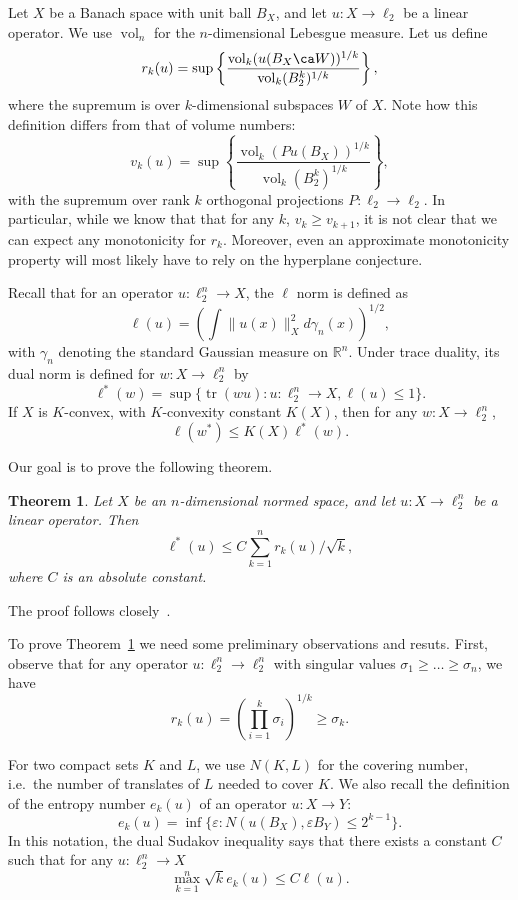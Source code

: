 \documentclass{article}
\newtheorem{theorem}{Theorem}
\newcommand{\R}{{\mathbb{R}}}
\DeclareMathOperator{\vol}{vol}
\DeclareMathOperator{\tr}{tr}
\begin{document}
Let $X$ be a Banach space with unit ball $B_X$, and let $u:X \to \ell_2$
be a linear operator. We use $\vol_n$ for the $n$-dimensional Lebesgue
measure. Let us define
\[
r_k(u) = \sup\left\{\frac{\vol_k(u(B_X \ca W))^{1/k}}{\vol_k(B_2^k)^{1/k}}\right\},
\]
where the supremum is over $k$-dimensional subspaces $W$ of $X$. Note how
this definition differs from that of  volume numbers: 
\[
v_k(u) = \sup\left\{\frac{\vol_k(Pu(B_X))^{1/k}}{\vol_k(B_2^k)^{1/k}}\right\},
\]
with the supremum over rank $k$ orthogonal projections $P:\ell_2 \to
\ell_2$. In particular, while we know that that for any $k$, $v_k \ge
v_{k+1}$, it is not clear that we can expect any monotonicity for
$r_k$. Moreover, even an approximate monotonicity property will
most likely have to rely on the hyperplane conjecture. 

Recall that for an operator $u: \ell_2^n \to X$, the $\ell$ norm is
defined as 
\[
\ell(u) = \left(\int\|u(x)\|_X^2d\gamma_n(x)\right)^{1/2},
\]
with $\gamma_n$ denoting the standard Gaussian measure on
$\R^n$. Under trace duality, its dual norm is defined for $w:X\to
\ell_2^n$ by
\[
\ell^*(w) = \sup\{\tr(wu): u:\ell_2^n \to X, \ell(u) \le 1\}.
\]
If $X$ is $K$-convex, with $K$-convexity constant $K(X)$, then for any
$w:X \to \ell_2^n$,
\begin{equation}
  \label{eq:K-convexity}
  \ell(w^*) \le K(X)\ell^*(w).
\end{equation}

Our goal is to prove the following theorem.
\begin{theorem}\label{thm:vol-num}
  Let $X$ be an $n$-dimensional normed space, and let $u:X \to \ell_2^n$
  be a linear operator. Then
  \[
  \ell^*(u) \le C \sum_{k = 1}^n{r_k(u)/\sqrt{k}},
  \]
  where $C$ is an absolute constant. 
\end{theorem}
The proof follows closely~\cite{PTJ89}.

To prove Theorem~\ref{thm:vol-num} we need some preliminary
observations and resuts. First, observe that for any operator
$u:\ell_2^n \to \ell_2^n$ with singular values $\sigma_1 \ge \ldots
\ge \sigma_n$, we have
\begin{equation}\label{eq:volnum-ell2}
r_k(u) = \left(\prod_{i = 1}^k\sigma_i\right)^{1/k} \ge \sigma_k.
\end{equation}

For two compact sets $K$ and $L$, we use $N(K,L)$ for the
covering number, i.e.~the number of translates of $L$ needed to cover
$K$. We also recall the definition of the entropy number $e_k(u)$ of
an operator $u:X \to Y$: 
\[
e_k(u) = \inf\{\varepsilon: N(u(B_X), \varepsilon B_Y) \le 2^{k-1}\}. 
\]
In this notation, the dual Sudakov inequality says that there exists a
constant $C$ such that for any $u:\ell_2^n \to X$
\begin{equation}
  \label{eq:sudakov}
  \max_{k = 1}^n \sqrt{k}e_k(u) \le C\ell(u). 
\end{equation}
\end{document}
